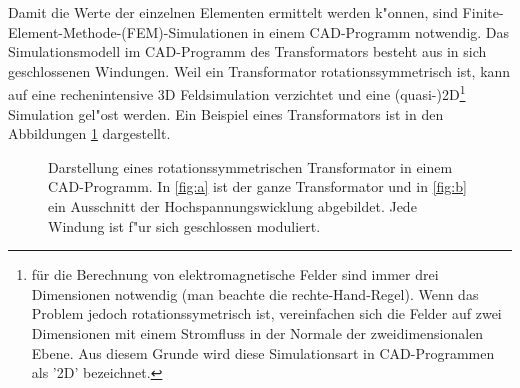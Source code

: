 \begin{refsection}
Damit die Werte der einzelnen Elementen ermittelt werden k"onnen, sind Finite-Element-Methode-(FEM)-Simulationen in einem CAD-Programm notwendig. Das Simulationsmodell im CAD-Programm des Transformators besteht aus in sich geschlossenen Windungen. Weil ein Transformator rotationssymmetrisch ist, kann auf eine rechenintensive 3D Feldsimulation verzichtet und eine (quasi-)2D\footnote{für die Berechnung von elektromagnetische Felder sind immer drei Dimensionen notwendig (man beachte die rechte-Hand-Regel). Wenn das Problem jedoch rotationssymetrisch ist, vereinfachen sich die Felder auf zwei Dimensionen mit einem Stromfluss in der Normale der zweidimensionalen Ebene. Aus diesem Grunde wird diese Simulationsart in CAD-Programmen als '2D' bezeichnet.} Simulation gel"ost werden. Ein Beispiel eines Transformators ist in den Abbildungen \ref{trafo:infolytica} dargestellt.

\begin{figure}
	\centering    
	\caption{Darstellung eines rotationssymmetrischen Transformator in einem CAD-Programm. In \ref{fig:a} ist der ganze Transformator und in \ref{fig:b} ein Ausschnitt der Hochspannungswicklung abgebildet. Jede Windung ist f"ur sich geschlossen moduliert.}
	\label{trafo:infolytica}
\end{figure}


\end{refsection}
